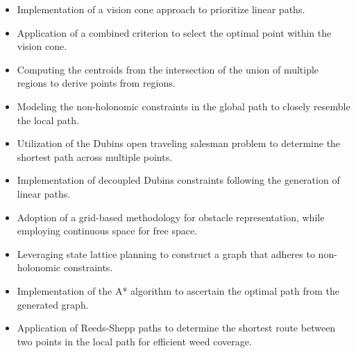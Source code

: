 \begin{itemize}[noitemsep]
    \setlength{\itemsep}{7pt}
    \item Implementation of a vision cone approach to prioritize linear paths.
    \item Application of a combined criterion to select the optimal point within the vision cone.
    \item Computing the centroids from the intersection of the union of multiple regions to derive points from regions.
    \item Modeling the non-holonomic constraints in the global path to closely resemble the local path.
    \item Utilization of the Dubins open traveling salesman problem to determine the shortest path across multiple points.
    \item Implementation of decoupled Dubins constraints following the generation of linear paths.
    \item Adoption of a grid-based methodology for obstacle representation, while employing continuous space for free space.
    \item Leveraging state lattice planning to construct a graph that adheres to non-holonomic constraints.
    \item Implementation of the A* algorithm to ascertain the optimal path from the generated graph.
    \item Application of Reeds-Shepp paths to determine the shortest route between two points in the local path for efficient weed coverage.
\end{itemize}
